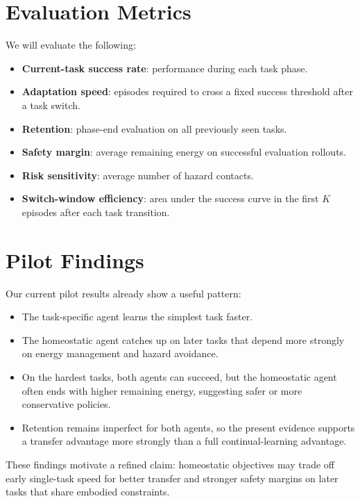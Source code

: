 \documentclass[11pt]{article}
\begin{document}
\section{Evaluation Metrics}
We will evaluate the following:
\begin{itemize}[leftmargin=1.5em]
    \item \textbf{Current-task success rate}: performance during each task phase.
    \item \textbf{Adaptation speed}: episodes required to cross a fixed success threshold after a task switch.
    \item \textbf{Retention}: phase-end evaluation on all previously seen tasks.
    \item \textbf{Safety margin}: average remaining energy on successful evaluation rollouts.
    \item \textbf{Risk sensitivity}: average number of hazard contacts.
    \item \textbf{Switch-window efficiency}: area under the success curve in the first $K$ episodes after each task transition.
\end{itemize}

\section{Pilot Findings}
Our current pilot results already show a useful pattern:
\begin{itemize}[leftmargin=1.5em]
    \item The task-specific agent learns the simplest task faster.
    \item The homeostatic agent catches up on later tasks that depend more strongly on energy management and hazard avoidance.
    \item On the hardest tasks, both agents can succeed, but the homeostatic agent often ends with higher remaining energy, suggesting safer or more conservative policies.
    \item Retention remains imperfect for both agents, so the present evidence supports a transfer advantage more strongly than a full continual-learning advantage.
\end{itemize}

These findings motivate a refined claim: homeostatic objectives may trade off early single-task speed for better transfer and stronger safety margins on later tasks that share embodied constraints.
\end{document}
